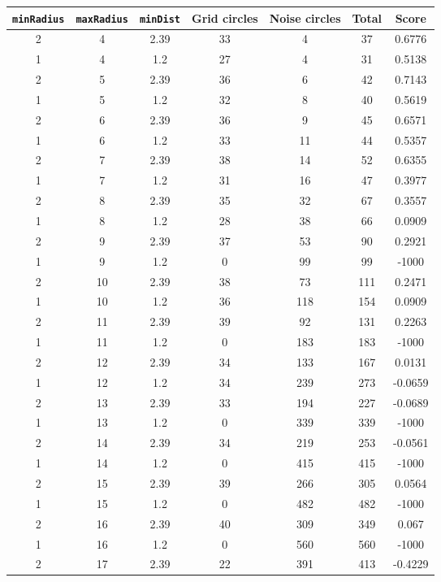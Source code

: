 \documentclass[letterpaper, 12pt]{article}
\begin{document}
\begin{longtable}{|c|c|c|c|c|c|c|}
\hline
\textbf{\texttt{minRadius}} & \textbf{\texttt{maxRadius}} & \textbf{\texttt{minDist}} & \textbf{Grid circles} & \textbf{Noise circles} & \textbf{Total} & \textbf{Score} \\
\hline
2 & 4 & 2.39 & 33 & 4 & 37 & 0.6776 \\
\hline
1 & 4 & 1.2 & 27 & 4 & 31 & 0.5138 \\
\hline
2 & 5 & 2.39 & 36 & 6 & 42 & 0.7143 \\
\hline
1 & 5 & 1.2 & 32 & 8 & 40 & 0.5619 \\
\hline
2 & 6 & 2.39 & 36 & 9 & 45 & 0.6571 \\
\hline
1 & 6 & 1.2 & 33 & 11 & 44 & 0.5357 \\
\hline
2 & 7 & 2.39 & 38 & 14 & 52 & 0.6355 \\
\hline
1 & 7 & 1.2 & 31 & 16 & 47 & 0.3977 \\
\hline
2 & 8 & 2.39 & 35 & 32 & 67 & 0.3557 \\
\hline
1 & 8 & 1.2 & 28 & 38 & 66 & 0.0909 \\
\hline
2 & 9 & 2.39 & 37 & 53 & 90 & 0.2921 \\
\hline
1 & 9 & 1.2 & 0 & 99 & 99 & -1000 \\
\hline
2 & 10 & 2.39 & 38 & 73 & 111 & 0.2471 \\
\hline
1 & 10 & 1.2 & 36 & 118 & 154 & 0.0909 \\
\hline
2 & 11 & 2.39 & 39 & 92 & 131 & 0.2263 \\
\hline
1 & 11 & 1.2 & 0 & 183 & 183 & -1000 \\
\hline
2 & 12 & 2.39 & 34 & 133 & 167 & 0.0131 \\
\hline
1 & 12 & 1.2 & 34 & 239 & 273 & -0.0659 \\
\hline
2 & 13 & 2.39 & 33 & 194 & 227 & -0.0689 \\
\hline
1 & 13 & 1.2 & 0 & 339 & 339 & -1000 \\
\hline
2 & 14 & 2.39 & 34 & 219 & 253 & -0.0561 \\
\hline
1 & 14 & 1.2 & 0 & 415 & 415 & -1000 \\
\hline
2 & 15 & 2.39 & 39 & 266 & 305 & 0.0564 \\
\hline
1 & 15 & 1.2 & 0 & 482 & 482 & -1000 \\
\hline
2 & 16 & 2.39 & 40 & 309 & 349 & 0.067 \\
\hline
1 & 16 & 1.2 & 0 & 560 & 560 & -1000 \\
\hline
2 & 17 & 2.39 & 22 & 391 & 413 & -0.4229 \\

\end{longtable}
\end{document}
